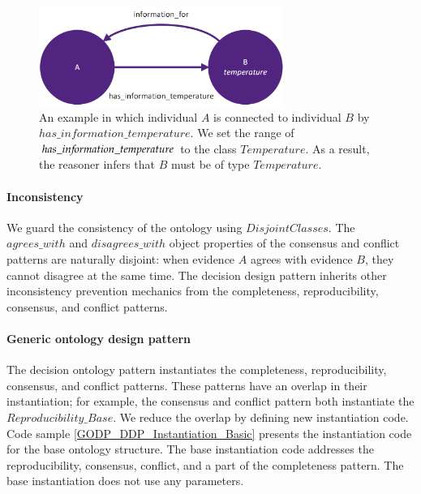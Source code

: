 \begin{figure}[H]
\centering
  \includegraphics[width=8cm]{../../Images/04_Contribution/04_DDP_Inference.png}
  \caption{An example in which individual $A$ is connected to individual $B$ by $has\_information\_temperature$. We set the range of $has\_in{\mkern-2mu f\mkern-3mu}ormation\_temperature$ to the class $Temperature$. As a result, the reasoner infers that $B$ must be of type $Temperature$.}
  \label{fig:04_DDP_Inference}
\end{figure}

\paragraph{Inconsistency}
We guard the consistency of the ontology using $DisjointClasses$. The $agrees\_with$ and $disagrees\_with$ object properties of the consensus and conflict patterns are naturally disjoint: when evidence $A$ agrees with evidence $B$, they cannot disagree at the same time. The decision design pattern inherits other inconsistency prevention mechanics from the completeness, reproducibility, consensus, and conflict patterns.

\paragraph{Generic ontology design pattern} \label{dop-godp}
The decision ontology pattern instantiates the completeness, reproducibility, consensus, and conflict patterns. These patterns have an overlap in their instantiation; for example, the consensus and conflict pattern both instantiate the $Reproducibility\_Base$. We reduce the overlap by defining new instantiation code. Code sample \ref{GODP_DDP_Instantiation_Basic} presents the instantiation code for the base ontology structure. The base instantiation code addresses the reproducibility, consensus, conflict, and a part of the completeness pattern. The base instantiation does not use any parameters.

